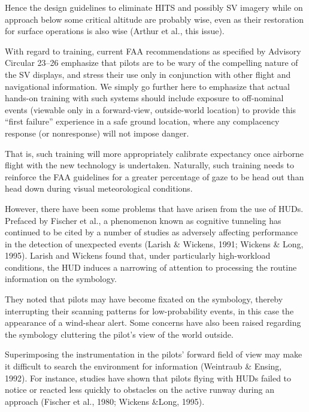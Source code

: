 \documentclass[utf8,bachelor,manualbib]{gradu3}
\begin{document}
Hence the design guidelines to eliminate HITS and possibly SV imagery while on approach below some critical altitude are probably wise, even as their restoration for surface operations is also wise (Arthur et al., this issue).

With regard to training, current FAA recommendations as specified by Advisory
Circular 23–26 emphasize that pilots are to be wary of the compelling nature
of the SV displays, and stress their use only in conjunction with other flight and
navigational information. We simply go further here to emphasize that actual
hands-on training with such systems should include exposure to off-nominal
events (viewable only in a forward-view, outside-world location) to provide this
“first failure” experience in a safe ground location, where any complacency response
(or nonresponse) will not impose danger.





That is, such training will more appropriately calibrate expectancy once airborne flight with the new technology is undertaken. Naturally, such training needs to reinforce the FAA guidelines for a greater percentage of gaze to be head out than head down during visual meteorological conditions. \citep{wickens2009}

However, there have been some problems that have arisen from the use of HUDs. Prefaced by Fischer et al., a phenomenon known as cognitive tunneling has continued to be cited by a number of studies as adversely affecting performance in the detection of unexpected events (Larish \& Wickens, 1991; Wickens \& Long, 1995). Larish and Wickens found that, under particularly high-workload conditions, the HUD induces a narrowing of attention to processing the routine information on the symbology.

They noted that pilots may have become fixated on the symbology, thereby interrupting their scanning patterns for low-probability events, in this case the appearance of a wind-shear alert. Some concerns have also been raised regarding the symbology cluttering the pilot's view of the world outside.

Superimposing the instrumentation in the pilots' forward field of view may make it difficult to search the environment for information (Weintraub \& Ensing, 1992). For instance, studies have shown that pilots flying with HUDs failed to notice or reacted less quickly to obstacles on the active runway during an approach (Fischer et al., 1980; Wickens \&Long, 1995).
\end{document}
